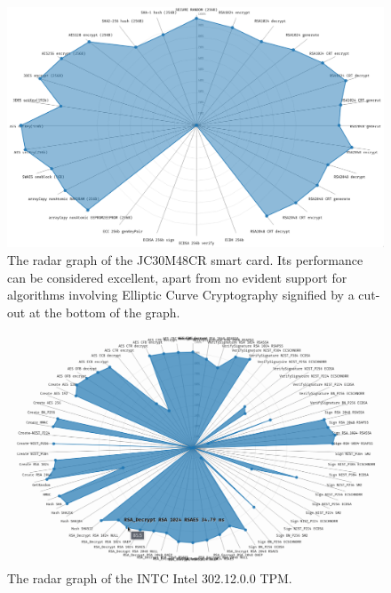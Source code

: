\begin{landscape}
\begin{figure}[!t]
    \centering
    \includegraphics[width=\linewidth]{img/visualizations/JC30M48CR radar graph.png}
    \caption{
    The radar graph of the JC30M48CR smart card. Its performance can be considered excellent, apart from no evident support for algorithms involving Elliptic Curve Cryptography signified by a cut-out at the bottom of the graph.
    }
\end{figure}
\end{landscape}

\begin{landscape}
\begin{figure}[!t]
    \centering
    \includegraphics[width=\linewidth]{img/visualizations/INTC_Intel_302.12.0.0 radar graph.png}
    \caption{
    The radar graph of the INTC Intel 302.12.0.0 TPM.
    }
\end{figure}
\end{landscape}

